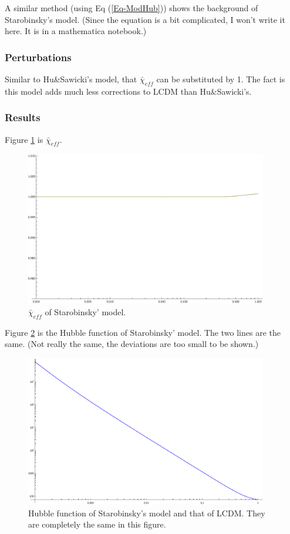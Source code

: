 \documentclass[12pt,a4paper]{article}
\begin{document}
A similar method (using Eq (\ref{Eq-ModHub})) shows the background of Starobinsky's model. (Since the  equation is a bit complicated, I won't write it here. It is in a mathematica notebook.)

\subsubsection{Perturbations}

Similar to Hu\&Sawicki's model, that $\bar\chi_{eff}$ can be substituted by 1. The fact is this model adds much less corrections to LCDM than Hu\&Sawicki's.

\subsubsection{Results}

Figure \ref{Fig-SBMod-chi} is $\bar\chi_{eff}$.

\begin{figure}[!htpb]
\centering
\includegraphics[width=300pt]{SBMod-chi.eps}
\caption{$\bar\chi_{eff}$ of Starobinsky' model.}\label{Fig-SBMod-chi}
\end{figure}


Figure \ref{Fig-SBMod-Hub} is the Hubble function of Starobinsky' model. The two lines are the same. (Not really the same, the deviations are too small to be shown.)
\begin{figure}[!htpb]
\centering
\includegraphics[width=300pt]{SBMod-Hub.eps}
\caption{Hubble function of Starobinsky's model and that of LCDM. They are completely the same in this figure.}\label{Fig-SBMod-Hub}
\end{figure}
\end{document}
